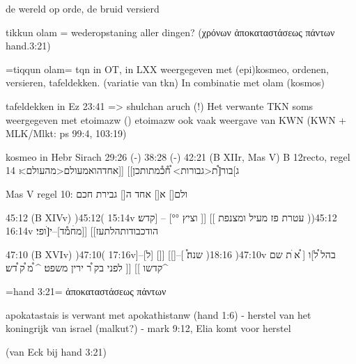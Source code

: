 de wereld op orde, de bruid versierd

tikkun olam = wederopstaning aller dingen? (χρόνων ἀποκαταστάσεως πάντων hand.3:21)

=tiqqun olam=
tqn in OT, in LXX weergegeven met (epi)kosmeo, ordenen, versieren, tafeldekken.
(variatie van tkn)
In combinatie met olam (kosmos)

tafeldekken in Ez 23:41 => shulchan aruch (!)
Het verwante TKN soms weergegeven met etoimazw ()
etoimazw ook vaak weergave van KWN 
  (KWN + MLK/Mlkt: ps 99:4, 103:19)

kosmeo in Hebr Sirach
29:26 (-)
38:28 (-)
42:21 (B XIIr, Mas V) 
  B 12recto, regel 14 ג]בור[֯ת<גבורות> ֯ח֯כ֯מתותכן]] [[אחדהואמעולם<מהעולם>׃

  Mas V regel 10: ‏ גבירת חכם‎[]‏ אחד ה‎[]‏ א‎[]‏ ולם


45:12 (B XIVv)
)45:12( 15:14v עטרת פז מעיל ומצנפת ]] [[ וציץ °°] -- [קדש׃
)45:12( 16:14v הודכבודותהלתעז]] [[מחׄמ֯ד]--י[ׄופי׃

47:10 (B XVIv)
)47:10( 17:16v]--[ל] []] [[]--[ ֯שנה׃
)47:10( 18:16v בהל ֯ל]ו [ ֯א ׄת שם קדשו ]] [[ לפני בק ֯ר ירין משפט׃ ^ ֯מ ֯ק ֯דש׃^


=hand 3:21=
ἀποκαταστάσεως πάντων

apokatastais is verwant met apokathistanw (hand 1:6)
- herstel van het koningrijk van israel (malkut?)
- mark 9:12, Elia komt voor herstel


(van Eck bij hand 3:21)